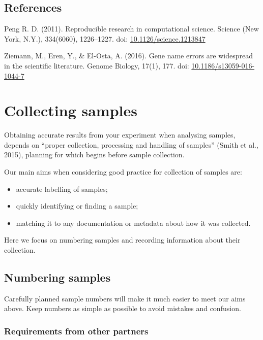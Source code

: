 \documentclass[12pt,a4paper,oneside]{report}
\providecommand{\tightlist}{%
  \setlength{\itemsep}{0pt}\setlength{\parskip}{0pt}}
\begin{document}
\hypertarget{references-5}{%
\section{References}\label{references-5}}

Peng R. D. (2011). Reproducible research in computational science.
Science (New York, N.Y.), 334(6060), 1226--1227. doi:
\href{https://doi.org/10.1126/science.1213847}{10.1126/science.1213847}

Ziemann, M., Eren, Y., \& El-Osta, A. (2016). Gene name errors are
widespread in the scientific literature. Genome Biology, 17(1), 177.
doi:
\href{https://doi.org/10.1186/s13059-016-1044-7}{10.1186/s13059-016-1044-7}

\hypertarget{collecting-samples}{%
\chapter{Collecting samples}\label{collecting-samples}}

Obtaining accurate results from your experiment when analysing samples,
depends on ``proper collection, processing and handling of samples''
(Smith et al., 2015), planning for which begins before sample
collection.

Our main aims when considering good practice for collection of samples
are:

\begin{itemize}
\tightlist
\item
  accurate labelling of samples;
\item
  quickly identifying or finding a sample;
\item
  matching it to any documentation or metadata about how it was
  collected.
\end{itemize}

Here we focus on numbering samples and recording information about their
collection.

\hypertarget{numbering-samples}{%
\section{Numbering samples}\label{numbering-samples}}

Carefully planned sample numbers will make it much easier to meet our
aims above. Keep numbers as simple as possible to avoid mistakes and
confusion.

\hypertarget{requirements-from-other-partners}{%
\subsection{Requirements from other
partners}\label{requirements-from-other-partners}}
\end{document}
